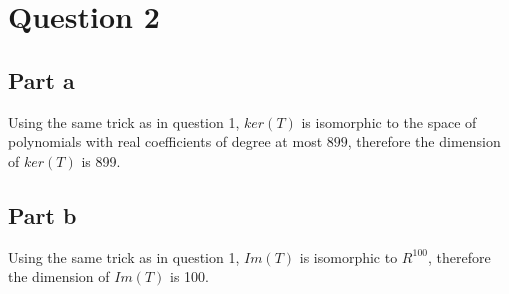 \section*{Question 2}
\subsection*{Part a}
Using the same trick as in question 1, $ ker(T) $ is isomorphic to the space of polynomials with real coefficients of degree at most $ 899 $, therefore the dimension of $ ker(T) $ is 899. 

\subsection*{Part b}

Using the same trick as in question 1, $ Im(T) $ is isomorphic to $ R^{100} $, therefore the dimension of $ Im(T) $ is 100.